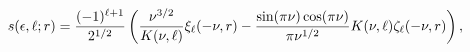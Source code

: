 \[\mathop{s\/}\nolimits\!\left(\epsilon,\ell;r\right)=\frac{(-1)^{\ell+1}}{2^{1/%
2}}\left(\frac{\nu^{3/2}}{K(\nu,\ell)}\xi_{\ell}(-\nu,r)-\frac{\mathop{\sin\/}%
\nolimits\!\left(\pi\nu\right)\mathop{\cos\/}\nolimits\!\left(\pi\nu\right)}{%
\pi\nu^{1/2}}K(\nu,\ell)\zeta_{\ell}(-\nu,r)\right),\]